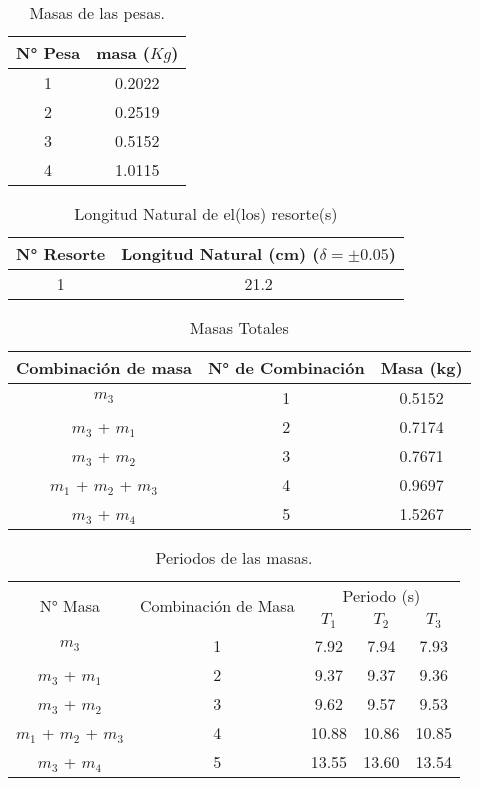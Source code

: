 \documentclass[../main.tex]{subfiles}
\begin{document}
\begin{table}[H]
    \centering
    \begin{tabular}{c|c}
        \hline
        N° Pesa & masa ($Kg$)\\
        \hline
        1 & 0.2022\\
        2 & 0.2519\\
        3 & 0.5152\\
        4 & 1.0115\\
        \hline
    \end{tabular}
    \caption{Masas de las pesas.}
\end{table}
\begin{table}[H]
    \centering
    \begin{tabular}{c|c}
        \hline
        N° Resorte & Longitud Natural (cm) ($\delta = \pm0.05$)\\
        \hline
        1 & 21.2\\
        \hline
    \end{tabular}
    \caption{Longitud Natural de el(los) resorte(s)}
\end{table}
\begin{table}[H]
    \centering
    \begin{tabular}{c|c|c}
        \hline
        Combinación de masa & N° de Combinación & Masa (kg) \\
        \hline
        $m_3$                 & 1 & 0.5152 \\
        $m_3$ + $m_1$         & 2 & 0.7174 \\
        $m_3$ + $m_2$         & 3 & 0.7671\\
        $m_1$ + $m_2$ + $m_3$ & 4 & 0.9697\\
        $m_3$ + $m_4$         & 5 & 1.5267\\
        \hline
    \end{tabular}
    \caption{Masas Totales}
\end{table}
\begin{table}[H]
    \centering
    \begin{tabular}{c|c|c|c|c}
        \hline
        \multirow{2}{*}{N° Masa} &
        \multirow{2}{*}{Combinación de Masa} &
        \multicolumn{3}{c}{Periodo (s)}\\
        \cline{3-5}
         &  & $T_1$ & $T_2$ & $T_3$\\
        \hline
        $m_3$                 & 1 & 7.92  & 7.94  & 7.93\\
        $m_3$ + $m_1$         & 2 & 9.37  & 9.37  & 9.36\\
        $m_3$ + $m_2$         & 3 & 9.62  & 9.57  & 9.53\\
        $m_1$ + $m_2$ + $m_3$ & 4 & 10.88 & 10.86 & 10.85\\
        $m_3$ + $m_4$         & 5 & 13.55 & 13.60 & 13.54\\
        \hline
    \end{tabular}
    \caption{Periodos de las masas.}
\end{table}
\end{document}
